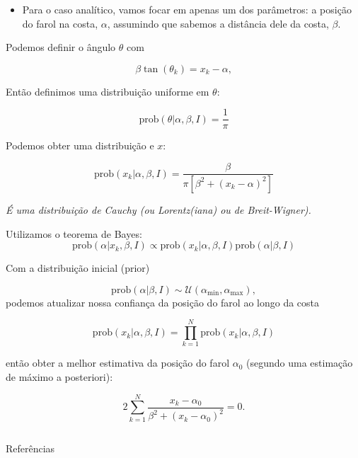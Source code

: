 \documentclass[aspectratio=169,xcolor=dvipsnames]{beamer}
\newcommand{\prob}{\text{prob}}
\begin{document}
\begin{frame}
  \begin{itemize}
    \item Para o caso analítico, vamos focar em apenas um dos parâmetros: a posição do farol na costa, $\alpha$, assumindo que sabemos a distância dele da costa, $\beta$.
  \end{itemize}

  Podemos definir o ângulo $\theta$ com

  \begin{equation}
    \beta \tan(\theta_k) = x_k - \alpha,
  \end{equation}

  Então definimos uma distribuição uniforme em $\theta$:

  \begin{equation}
    \prob(\theta | \alpha, \beta, I) = \frac{1}{\pi}
  \end{equation}

  Podemos obter uma distribuição e $x$:

  \begin{equation}
    \prob(x_k | \alpha, \beta, I) = \frac{\beta}{\pi \left[ \beta^2 + (x_k - \alpha)^2 \right]} 
  \end{equation}

  \emph{É uma distribuição de Cauchy (ou Lorentz(iana) ou de Breit-Wigner).}
\end{frame}

\begin{frame} 
  Utilizamos o teorema de Bayes:
  \begin{equation}
    \prob(\alpha | {x_k}, \beta, I) \propto \prob({x_k} | \alpha, \beta, I) \prob(\alpha | \beta, I)
  \end{equation}

  Com a distribuição inicial (prior)

  \begin{equation}
    \prob(\alpha | \beta, I) \sim \mathcal{U}(\alpha_\text{min}, \alpha_\text{max}),
  \end{equation}
  podemos atualizar nossa confiança da posição do farol ao longo da costa

  \begin{equation}
    \prob({x_k} | \alpha, \beta, I) = \prod_{k=1}^{N} \prob(x_k | \alpha, \beta, I)
  \end{equation}

  então obter a melhor estimativa da posição do farol $\alpha_0$ (segundo uma estimação de máximo a posteriori):

  \begin{equation}
    2 \sum_{k=1}^{N} \frac{x_k - \alpha_0}{\beta^2 + (x_k - \alpha_0)^2} = 0.
  \end{equation}
\end{frame}

\begin{equation}
  
\end{equation}

\begin{frame}{Referências}
  \printbibliography[heading=none] 
\end{frame}
\end{document}
